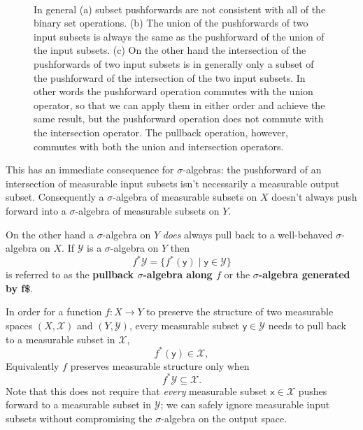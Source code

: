 \documentclass[
  letterpaper,
  DIV=11,
  numbers=noendperiod]{scrartcl}
\begin{document}
\begin{figure}
\begin{minipage}[t]{0.18\linewidth}
{\centering 

~

}

\end{minipage}%

\caption{\label{fig-set-op-consistency}In general (a) subset
pushforwards are not consistent with all of the binary set operations.
(b) The union of the pushforwards of two input subsets is always the
same as the pushforward of the union of the input subsets. (c) On the
other hand the intersection of the pushforwards of two input subsets is
in generally only a subset of the pushforward of the intersection of the
two input subsets. In other words the pushforward operation commutes
with the union operator, so that we can apply them in either order and
achieve the same result, but the pushforward operation does not commute
with the intersection operator. The pullback operation, however,
commutes with both the union and intersection operators.}

\end{figure}

This has an immediate consequence for \(\sigma\)-algebras: the
pushforward of an intersection of measurable input subsets isn't
necessarily a measurable output subset. Consequently a
\(\sigma\)-algebra of measurable subsets on \(X\) doesn't always push
forward into a \(\sigma\)-algebra of measurable subsets on \(Y\).

On the other hand a \(\sigma\)-algebra on \(Y\) \emph{does} always pull
back to a well-behaved \(\sigma\)-algebra on \(X\). If \(\mathcal{Y}\)
is a \(\sigma\)-algebra on \(Y\) then \[
f^{*} \mathcal{Y} =
\{ f^{*}(\mathsf{y}) \mid \mathsf{y} \in \mathcal{Y} \}
\] is referred to as the \textbf{pullback \(\sigma\)-algebra along
\(f\)} or the \textbf{\(\sigma\)-algebra generated by f\$}.

In order for a function \(f: X \rightarrow Y\) to preserve the structure
of two measurable spaces \((X, \mathcal{X})\) and \((Y, \mathcal{Y})\),
every measurable subset \(\mathsf{y} \in \mathcal{Y}\) needs to pull
back to a measurable subset in \(\mathcal{X}\), \[
f^{*}(\mathsf{y}) \in \mathcal{X},
\] Equivalently \(f\) preserves measurable structure only when \[
f^{*} \mathcal{Y} \subseteq \mathcal{X}.
\] Note that this does not require that \emph{every} measurable subset
\(\mathsf{x} \in \mathcal{X}\) pushes forward to a measurable subset in
\(\mathcal{Y}\); we can safely ignore measurable input subsets without
compromising the \(\sigma\)-algebra on the output space.
\end{document}
